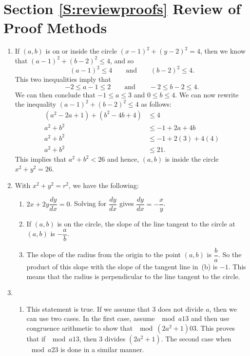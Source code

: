\section*{Section \ref{S:reviewproofs} Review of Proof Methods}


\begin{enumerate}
\item If $(a, b)$ is on or inside the circle $(x - 1)^2 + (y - 2)^2 = 4$, then we know that 
$(a - 1)^2 + (b - 2)^2 \leq 4$, and so 
\[
(a - 1)^2 \leq 4 \qquad \text{and} \qquad (b - 2)^2 \leq 4.  
\]
This two inequalities imply that
\[
-2 \leq a - 1 \leq 2 \qquad \text{and} \qquad -2 \leq b - 2 \leq 4.
\]
We can then conclude that $-1 \leq a \leq 3$ and $0 \leq b \leq 4$.  We can now rewrite the inequality $(a - 1)^2 + (b - 2)^2 \leq 4$ as follows:
\begin{align*}
(a^2 - 2a + 1) + (b^2 - 4b + 4) &\leq 4 \\
a^2 + b^2 &\leq -1 + 2a + 4b \\
a^2 + b^2 &\leq -1 + 2(3) + 4(4) \\
a^2 + b^2 &\leq 21.
\end{align*}
This implies that $a^2 + b^2 < 26$ and hence, $(a, b)$ is inside the circle $x^2 + y^2 = 26$.


\item With $x^2 + y^2 = r^2$, we have the following:
\begin{enumerate}
\item $2x + 2y \dfrac{dy}{dx} = 0$.  Solving for $\dfrac{dy}{dx}$ gives 
$\dfrac{dy}{dx} = -\dfrac{x}{y}$.

\item If $(a, b)$ is on the circle, the slope of the line tangent to the circle at $(a, b)$ is 
$-\dfrac{a}{b}$.

\item The slope of the radius from the origin to the point $(a, b)$ is $\dfrac{b}{a}$.  So the product of this slope with the slope of the tangent line in~(b) is $-1$.  This means that the radius is perpendicular to the line tangent to the circle.
\end{enumerate}


\item \begin{enumerate}
\item  This statement is true.  If we assume that 3 does not divide $a$, then we can use two cases.  In the first case, assume $\mod{a}{1}{3}$ and then use congruence arithmetic to show that $\mod{\left(2a^2 + 1 \right)}{0}{3}$.  This proves that if $\mod{a}{1}{3}$, then 3 divides $\left(2a^2 + 1 \right)$.  The second case when $\mod{a}{2}{3}$ is done in a similar manner.


\end{enumerate}
\end{enumerate}
